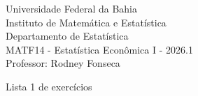 \documentclass{article}
\date{--/--/----} %
\begin{document}
\begin{flushleft}
	Universidade Federal da Bahia\\
	Instituto de Matemática e Estatística\\
	Departamento de Estatística\\
	MATF14 - Estatística Econômica I - 2026.1\\
	Professor: Rodney Fonseca \\
\end{flushleft}

\begin{center}
	\begin{Large}
		Lista 1 de exercícios \\
	\end{Large}	
\end{center}





\vspace{2em}
\end{document}

